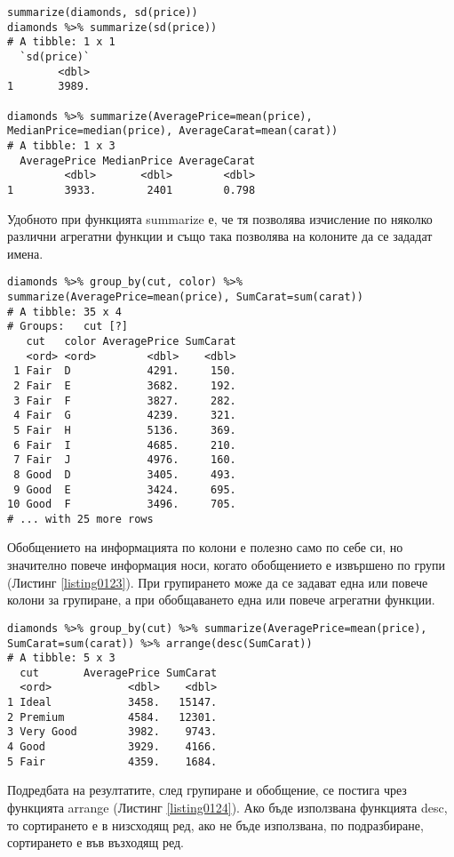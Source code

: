 \begin{lstlisting}[caption=Обобщаваща информация, label=listing0122]
summarize(diamonds, sd(price))
diamonds %>% summarize(sd(price))
# A tibble: 1 x 1
  `sd(price)`
        <dbl>
1       3989.

diamonds %>% summarize(AveragePrice=mean(price), MedianPrice=median(price), AverageCarat=mean(carat))
# A tibble: 1 x 3
  AveragePrice MedianPrice AverageCarat
         <dbl>       <dbl>        <dbl>
1        3933.        2401        0.798
\end{lstlisting}

Удобното при функцията summarize е, че тя позволява изчисление по няколко различни агрегатни функции и също така позволява на колоните да се зададат имена. 

\begin{lstlisting}[caption=Групиране при обобщение, label=listing0123]
diamonds %>% group_by(cut, color) %>% summarize(AveragePrice=mean(price), SumCarat=sum(carat))
# A tibble: 35 x 4
# Groups:   cut [?]
   cut   color AveragePrice SumCarat
   <ord> <ord>        <dbl>    <dbl>
 1 Fair  D            4291.     150.
 2 Fair  E            3682.     192.
 3 Fair  F            3827.     282.
 4 Fair  G            4239.     321.
 5 Fair  H            5136.     369.
 6 Fair  I            4685.     210.
 7 Fair  J            4976.     160.
 8 Good  D            3405.     493.
 9 Good  E            3424.     695.
10 Good  F            3496.     705.
# ... with 25 more rows
\end{lstlisting}

Обобщението на информацията по колони е полезно само по себе си, но значително повече информация носи, когато обобщението е извършено по групи (Листинг \ref{listing0123}). При групирането може да се задават една или повече колони за групиране, а при обобщаването една или повече агрегатни функции. 

\begin{lstlisting}[caption=Подредба на резултатите, label=listing0124]
diamonds %>% group_by(cut) %>% summarize(AveragePrice=mean(price), SumCarat=sum(carat)) %>% arrange(desc(SumCarat))
# A tibble: 5 x 3
  cut       AveragePrice SumCarat
  <ord>            <dbl>    <dbl>
1 Ideal            3458.   15147.
2 Premium          4584.   12301.
3 Very Good        3982.    9743.
4 Good             3929.    4166.
5 Fair             4359.    1684.
\end{lstlisting}

Подредбата на резултатите, след групиране и обобщение, се постига чрез функцията arrange (Листинг \ref{listing0124}). Ако бъде използвана функцията desc, то сортирането е в низсходящ ред, ако не бъде използвана, по подразбиране, сортирането е във възходящ ред.

